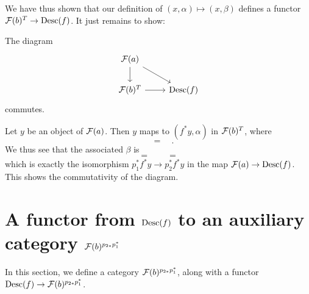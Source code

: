\documentclass{amsart}
\begin{document}
    We have thus shown that our definition of $(x,\alpha)\mapsto (x,\beta)$
        defines a functor $\mathcal F(b)^T\to \operatorname{Desc}(f)$.
    It just remains to show:
    \begin{proposition}
        The diagram
        \[
            \begin{tikzcd}
                \mc F(a) \arrow[rd]  \arrow[d] & \\
                \mc F(b)^T \arrow[r] & \Desc(f)
            \end{tikzcd}
        \]
            commutes.
    \end{proposition}
    Let $y$ be an object of $\mathcal F(a)$.
    Then $y$ maps to $(f^\ast y, \alpha)$ in $\mathcal F(b)^T$, where
    \[
        
        \quad =\quad
        
        .
    \]
    We thus see that the associated $\beta$ is
    \[
        
        \quad=\quad
        
        \quad=\quad
        
    \]
        which is exactly the isomorphism $p_1^\ast f^\ast y\to p_2^\ast f^\ast y$
        in the map $\mathcal F(a)\to \operatorname{Desc}(f)$.
    This shows the commutativity of the diagram.
\section{A functor from $\operatorname{Desc}(f)$ to an auxiliary category $\mathcal F(b)^{p_{2\ast}p_1^\ast}$}
    In this section, we define a category $\mathcal F(b)^{p_{2\ast}p_1^\ast}$,
        along with a functor $\operatorname{Desc}(f)\to \mathcal F(b)^{p_{2\ast}p_1^\ast}$.
\end{document}
